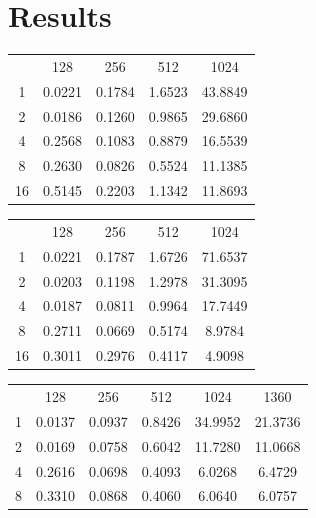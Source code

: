 \documentclass[a4paper,11pt]{article}
\begin{document}
\section{Results}
\label{app:rawresults}

\begin{center}
\begin{tabular}{c | c | c | c | c}
   & 128 & 256 & 512 & 1024 \\
1  & 0.0221 & 0.1784 & 1.6523 & 43.8849 \\
2  & 0.0186 & 0.1260 & 0.9865 & 29.6860 \\
4  & 0.2568 & 0.1083 & 0.8879 & 16.5539 \\ 
8  & 0.2630 & 0.0826 & 0.5524 & 11.1385 \\
16 & 0.5145 & 0.2203 & 1.1342 & 11.8693 \\
\end{tabular}
\vspace{1em}
\end{center}

\begin{center}
\begin{tabular}{c | c | c | c | c}
   & 128 & 256 & 512 & 1024 \\
1  & 0.0221 & 0.1787 & 1.6726 & 71.6537 \\
2  & 0.0203 & 0.1198 & 1.2978 & 31.3095 \\
4  & 0.0187 & 0.0811 & 0.9964 & 17.7449 \\
8  & 0.2711 & 0.0669 & 0.5174 & 8.9784 \\
16 & 0.3011 & 0.2976 & 0.4117 & 4.9098
\end{tabular}
\vspace{1em}
\end{center}

\begin{center}
\begin{tabular}{c | c | c | c | c | c}
   & 128 & 256 & 512 & 1024 & 1360\\
1 & 0.0137 & 0.0937 & 0.8426 & 34.9952 & 21.3736 \\
2 & 0.0169 & 0.0758 & 0.6042 & 11.7280 & 11.0668 \\
4 & 0.2616 & 0.0698 & 0.4093 & 6.0268 & 6.4729 \\
8 & 0.3310 & 0.0868 & 0.4060 & 6.0640 & 6.0757
\end{tabular}
\vspace{1em}
\end{center}
\end{document}
